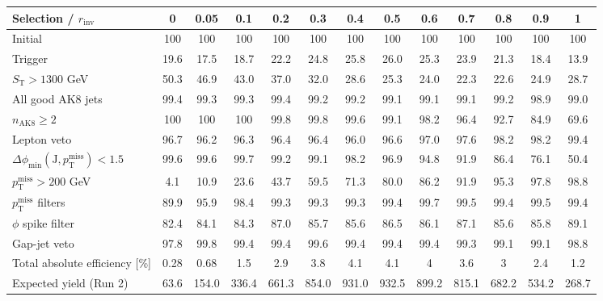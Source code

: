 {\footnotesize\setlength{\tabcolsep}{1.45pt}\renewcommand{\arraystretch}{0.82}%
\begin{tabular}{@{}lcccccccccccc@{}}
\hline
Selection / $r_{\mathrm{inv}}$ & 0 & 0.05 & 0.1 & 0.2 & 0.3 & 0.4 & 0.5 & 0.6 & 0.7 & 0.8 & 0.9 & 1 \\
\hline
Initial & 100 & 100 & 100 & 100 & 100 & 100 & 100 & 100 & 100 & 100 & 100 & 100 \\
Trigger & 19.6 & 17.5 & 18.7 & 22.2 & 24.8 & 25.8 & 26.0 & 25.3 & 23.9 & 21.3 & 18.4 & 13.9 \\
$S_{\mathrm{T}}>1300$ GeV & 50.3 & 46.9 & 43.0 & 37.0 & 32.0 & 28.6 & 25.3 & 24.0 & 22.3 & 22.6 & 24.9 & 28.7 \\
All good AK8 jets & 99.4 & 99.3 & 99.3 & 99.4 & 99.2 & 99.2 & 99.1 & 99.1 & 99.1 & 99.2 & 98.9 & 99.0 \\
$n_{\mathrm{AK8}}\geq 2$ & 100 & 100 & 100 & 99.8 & 99.8 & 99.6 & 99.1 & 98.2 & 96.4 & 92.7 & 84.9 & 69.6 \\
Lepton veto & 96.7 & 96.2 & 96.3 & 96.4 & 96.4 & 96.0 & 96.6 & 97.0 & 97.6 & 98.2 & 98.2 & 99.4 \\
$\Delta\phi_{\min}(\mathrm{J},p_{\mathrm{T}}^{\mathrm{miss}})<1.5$ & 99.6 & 99.6 & 99.7 & 99.2 & 99.1 & 98.2 & 96.9 & 94.8 & 91.9 & 86.4 & 76.1 & 50.4 \\
$p_{\mathrm{T}}^{\mathrm{miss}}>200$ GeV & 4.1 & 10.9 & 23.6 & 43.7 & 59.5 & 71.3 & 80.0 & 86.2 & 91.9 & 95.3 & 97.8 & 98.8 \\
$p_{\mathrm{T}}^{\mathrm{miss}}$ filters & 89.9 & 95.9 & 98.4 & 99.3 & 99.3 & 99.3 & 99.4 & 99.7 & 99.5 & 99.4 & 99.5 & 99.4 \\
$\phi$ spike filter & 82.4 & 84.1 & 84.3 & 87.0 & 85.7 & 85.6 & 86.5 & 86.1 & 87.1 & 85.6 & 85.8 & 89.1 \\
Gap-jet veto & 97.8 & 99.8 & 99.4 & 99.4 & 99.6 & 99.4 & 99.4 & 99.4 & 99.3 & 99.1 & 99.1 & 98.8 \\
\hline
Total absolute efficiency [\%] & 0.28 & 0.68 & 1.5 & 2.9 & 3.8 & 4.1 & 4.1 & 4 & 3.6 & 3 & 2.4 & 1.2 \\
\hline
Expected yield (Run 2) & 63.6 & 154.0 & 336.4 & 661.3 & 854.0 & 931.0 & 932.5 & 899.2 & 815.1 & 682.2 & 534.2 & 268.7 \\
\hline
\end{tabular}%
}

